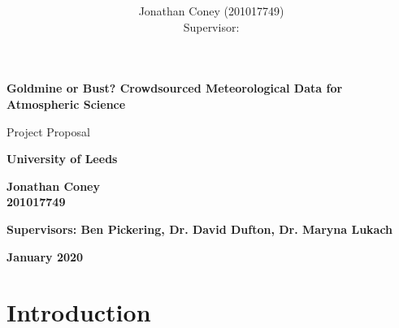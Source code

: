 \documentclass[11pt,a4paper,oneside]{article}
\title{ }
\author{Jonathan Coney (201017749)\\ Supervisor: }
\date{ }
\begin{document}
\onehalfspacing




\begin{titlepage}
\begin{center}
\Huge
        \textbf{Goldmine or Bust? Crowdsourced Meteorological Data for Atmospheric Science}
 

 \vspace{0.5mm}
 
        \LARGE
        Project Proposal
 
       \vspace{0.5cm}
        \textbf{University of Leeds}
    
    \vspace{1cm}

        \textbf{Jonathan Coney\\201017749}

 \vspace{1.5cm}
 
 \large
 \textbf{Supervisors: Ben Pickering, Dr. David Dufton, Dr. Maryna Lukach }

\vspace{1cm}
 \textbf{January 2020}
        \vspace{0.8cm}

\end{center}
\end{titlepage}
\begin{abstract}


\end{abstract}

\newpage
\setcounter{page}{2}

\setcounter{tocdepth}{2}
\tableofcontents


\newpage
\section{Introduction}

\printbibliography
{}
\end{document}
